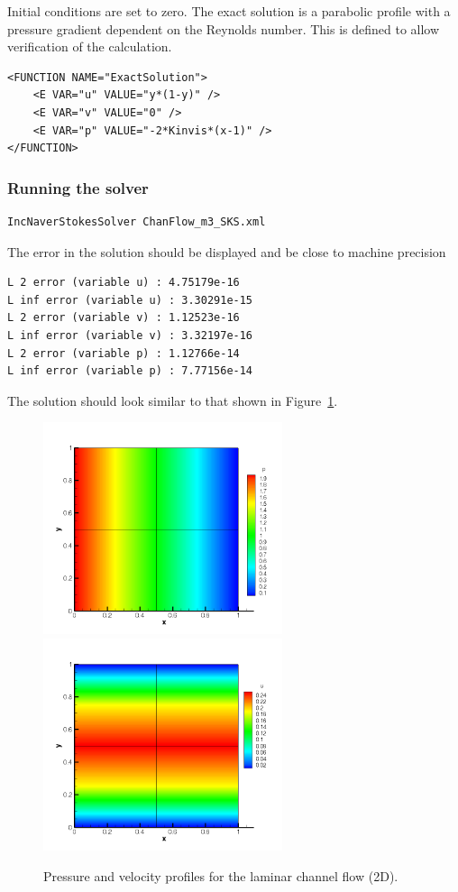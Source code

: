 Initial conditions are set to zero. The exact solution is a parabolic profile
with a pressure gradient dependent on the Reynolds number. This is defined to
allow verification of the calculation.
\begin{lstlisting}[style=XMLStyle]
<FUNCTION NAME="ExactSolution">
    <E VAR="u" VALUE="y*(1-y)" />
    <E VAR="v" VALUE="0" />
    <E VAR="p" VALUE="-2*Kinvis*(x-1)" />
</FUNCTION>
\end{lstlisting}

\subsubsection{Running the solver}
\begin{lstlisting}[style=BashInputStyle]
IncNaverStokesSolver ChanFlow_m3_SKS.xml
\end{lstlisting}

The error in the solution should be displayed and be close to machine precision
\begin{lstlisting}[style=BashInputStyle]
L 2 error (variable u) : 4.75179e-16
L inf error (variable u) : 3.30291e-15
L 2 error (variable v) : 1.12523e-16
L inf error (variable v) : 3.32197e-16
L 2 error (variable p) : 1.12766e-14
L inf error (variable p) : 7.77156e-14
\end{lstlisting}

The solution should look similar to that shown in
Figure~\ref{f:incns:laminar2d}.

\begin{figure}
\begin{center}
\includegraphics[width=7cm]{Figures/CF2DSKP3PR.png}
\includegraphics[width=7cm]{Figures/CF2DSKP3.png}
\caption{Pressure and velocity profiles for the laminar channel flow (2D).}
\label{f:incns:laminar2d}
\end{center}
\end{figure}



